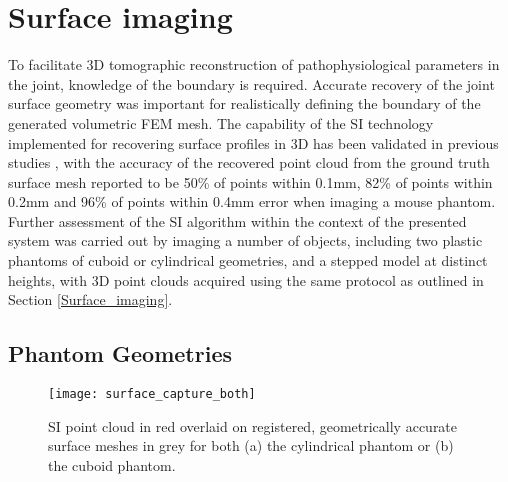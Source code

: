 \documentclass[twoside]{bhamthesis}
\theoremstyle{definition}
\begin{document}

\section{Surface imaging}

To facilitate 3D tomographic reconstruction of pathophysiological parameters in the joint, knowledge of the boundary is required. Accurate recovery of the joint surface geometry was important for realistically defining the boundary of the generated volumetric FEM mesh. The capability of the SI technology implemented for recovering surface profiles in 3D has been validated in previous studies \cite{basevi2013simultaneous,guggenheim2014multi}, with the accuracy of the recovered point cloud from the ground truth surface mesh reported to be 50\% of points within 0.1mm, 82\% of points within 0.2mm and 96\% of points within 0.4mm error when imaging a mouse phantom. Further assessment of the SI algorithm within the context of the presented system was carried out by imaging a number of objects, including two plastic phantoms of cuboid or cylindrical geometries, and a stepped model at distinct heights, with 3D point clouds acquired using the same protocol as outlined in Section \ref{Surface_imaging}.


\subsection{Phantom Geometries}
\label{phantom_SI}

\begin{figure}[!ht]
\texttt{[image: surface\_capture\_both]}
\centering
\caption{SI point cloud in red overlaid on registered, geometrically accurate surface meshes in grey for both (a) the cylindrical phantom or (b) the cuboid phantom.}
\label{surface_capture_both}
\end{figure}
\end{document}
